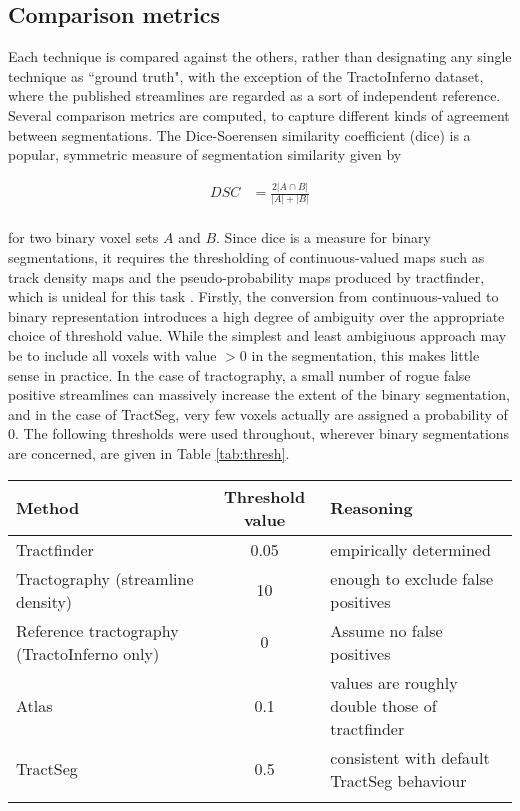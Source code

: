 \subsection{Comparison metrics}

Each technique is compared against the others, rather than designating any single technique as ``ground truth", with the exception of the TractoInferno dataset, where the published streamlines are regarded as a sort of independent reference.
Several comparison metrics are computed, to capture different kinds of agreement between segmentations.
The Dice-Soerensen similarity coefficient (\gls{dice}) \autocite{Dice1945} is a popular, symmetric measure of segmentation similarity given by

\begin{align}
  DSC &= \frac{2 |A \cap B|}{|A| + |B|} \\
\end{align}

for two binary voxel sets $A$ and $B$.
Since \gls{dice} is a measure for binary segmentations, it requires the thresholding of continuous-valued maps such as track density maps and the pseudo-probability maps produced by tractfinder, which is unideal for this task .
Firstly, the conversion from continuous-valued to binary representation introduces a high degree of ambiguity over the appropriate choice of threshold value.
While the simplest and least ambigiuous approach may be to include all voxels with value $>0$ in the segmentation, this makes little sense in practice.
In the case of tractography, a small number of rogue false positive streamlines can massively increase the extent of the binary segmentation, and in the case of TractSeg, very few voxels actually are assigned a probability of 0.
The following thresholds were used throughout, wherever binary segmentations are concerned, are given in Table \ref{tab:thresh}.

\begin{tabularx}{\textwidth}{X c X}
  Method    & Threshold value & Reasoning \\
  \hline
  Tractfinder   & 0.05 & empirically determined \\
  Tractography (streamline density) & 10 & enough to exclude false positives \\
  Reference tractography (TractoInferno only) & 0 & Assume no false positives \\
  Atlas         & 0.1 & values are roughly double those of tractfinder \\
  TractSeg      & 0.5 & consistent with default TractSeg behaviour \\
  \hline
  \vspace{\baselineskip}
\end{tabularx}

